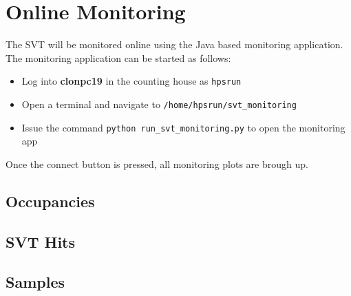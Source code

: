
\section {Online Monitoring}

The SVT will be monitored online using the Java based monitoring application.
The monitoring application can be started as follows: 

\begin {itemize}
    \item Log into \textbf{clonpc19} in the counting house as \texttt{hpsrun}
    \item Open a terminal and navigate to \texttt{/home/hpsrun/svt\_monitoring}
    \item Issue the command \texttt{python run\_svt\_monitoring.py} to open the monitoring app
\end {itemize}
Once the connect button is pressed, all monitoring plots are brough up. 

\subsection {Occupancies}

\subsection {SVT Hits}

\subsection {Samples}


